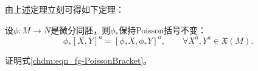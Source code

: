 由上述定理立刻可得如下定理：
\begin{theorem}\label{chdm:thm_push-Poisson}
    设$\phi:M\to N$是微分同胚，则$\phi_{*}$保持Poisson括号不变：
    \begin{equation}\label{chdm:eqn_push-Poisson}
        \phi_{*} [X,Y]^a = \left[\phi_{*}X,\phi_{*}Y\right]^a, \qquad
        \forall X^a, Y^a \in \mathfrak{X}(M) .
    \end{equation}
\end{theorem}


\begin{exercise}
	证明式\eqref{chdm:eqn_fg-PoissonBracket}。
\end{exercise}

